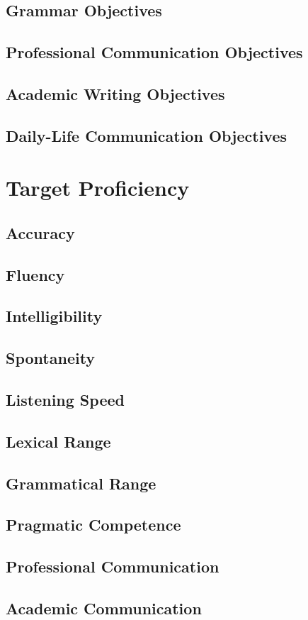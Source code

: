 \subsection{Grammar Objectives}
\subsection{Professional Communication Objectives}
\subsection{Academic Writing Objectives}
\subsection{Daily-Life Communication Objectives}

\section{Target Proficiency}
\subsection{Accuracy}
\subsection{Fluency}
\subsection{Intelligibility}
\subsection{Spontaneity}
\subsection{Listening Speed}
\subsection{Lexical Range}
\subsection{Grammatical Range}
\subsection{Pragmatic Competence}
\subsection{Professional Communication}
\subsection{Academic Communication}
